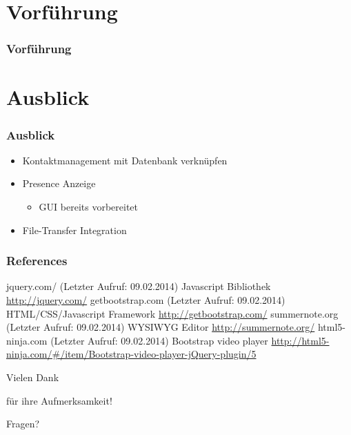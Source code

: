 \documentclass{beamer}
\begin{document}
\section{Vorführung}
		\begin{frame}
			\frametitle{Vorführung}
			\href{run:/Users/dannyk/Desktop/test.txt}
				{}
		\end{frame}

\section{Ausblick}
	\begin{frame}
		\frametitle{Ausblick}
		\begin{itemize}[<+->]
			\item Kontaktmanagement mit Datenbank verknüpfen
			\item Presence Anzeige
			\begin{itemize}[<2->]
				\item GUI bereits vorbereitet
			\end{itemize}
			\item File-Transfer Integration
		\end{itemize}
	\end{frame}

\begin{frame}[fragile]
\frametitle{References}
\tiny{
\begin{thebibliography}{99}
 jquery.com/ (Letzter Aufruf: 09.02.2014)
	\newblock Javascript Bibliothek
	\newblock \url{http://jquery.com/}
 getbootstrap.com (Letzter Aufruf: 09.02.2014)
	\newblock HTML/CSS/Javascript Framework
	\newblock \url{http://getbootstrap.com/}
 summernote.org (Letzter Aufruf: 09.02.2014)
	\newblock WYSIWYG Editor
	\newblock \url{http://summernote.org/}
 html5-ninja.com (Letzter Aufruf: 09.02.2014)
	\newblock Bootstrap video player
	\newblock
	\url{http://html5-ninja.com/#/item/Bootstrap-video-player-jQuery-plugin/5}

\end{thebibliography}
}
\end{frame}
\begin{frame}
\Large{\centerline{Vielen Dank}}
\Large{\centerline{für ihre Aufmerksamkeit!}}
\Large{\centerline{}}
\Large{\centerline{Fragen?}}
\end{frame}
\end{document}

